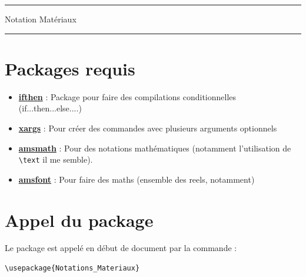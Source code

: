 \documentclass[a4paper,12pt]{article}
\begin{document}
	\begin{center}
		\hrule{\Large Notation Matériaux}\\\hrule
	\end{center}

	\section{Packages requis}
		\begin{itemize}
			\item \href{http://www.ctan.org/pkg/ifthen}{\textbf{ifthen}} : Package pour faire des compilations conditionnelles (if...then...else....)
			\item \href{http://www.ctan.org/pkg/xargs}{\textbf{xargs}} : Pour créer des commandes avec plusieurs arguments optionnels
			\item \href{http://www.ctan.org/pkg/amsmath}{\textbf{amsmath}} : Pour des notations mathématiques (notamment l'utilisation de \verb!\text! il me semble).
			\item \href{http://www.ams.org/publications/authors/tex/amsfonts}{\textbf{amsfont}} : Pour faire des maths (ensemble des reels, notamment)
		\end{itemize}

	\section{Appel du package}

		Le package est appelé en début de document par la commande :
		\begin{verbatim}
\usepackage{Notations_Materiaux}
		\end{verbatim}

% 
\end{document}
